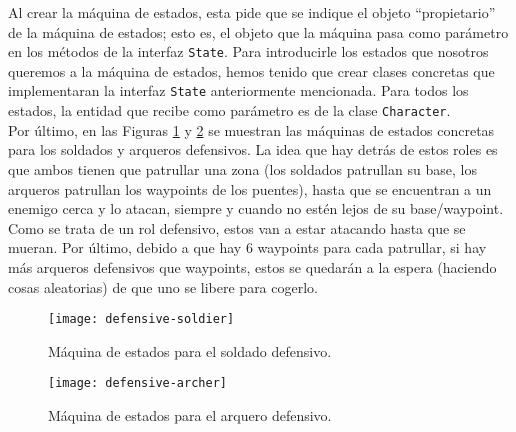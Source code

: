 Al crear la máquina de estados, esta pide que se indique el objeto ``propietario'' de la máquina de estados; esto es, el objeto que la máquina pasa como parámetro en los métodos de la interfaz \texttt{State}. Para introducirle los estados que nosotros queremos a la máquina de estados, hemos tenido que crear clases concretas que implementaran la interfaz \texttt{State} anteriormente mencionada. Para todos los estados, la entidad que recibe como parámetro es de la clase \texttt{Character}. \\

Por último, en las Figuras \ref{defensivos:soldado} y \ref{defensivos:arquero} se muestran las máquinas de estados concretas para los soldados y arqueros defensivos. La idea que hay detrás de estos roles es que ambos tienen que patrullar una zona (los soldados patrullan su base, los arqueros patrullan los waypoints de los puentes), hasta que se encuentran a un enemigo cerca y lo atacan, siempre y cuando no estén lejos de su base/waypoint. Como se trata de un rol defensivo, estos van a estar atacando hasta que se mueran. Por último, debido a que hay 6 waypoints para cada patrullar, si hay más arqueros defensivos que waypoints, estos se quedarán a la espera (haciendo cosas aleatorias) de que uno se libere para cogerlo.
\begin{figure}[!th]
\texttt{[image: defensive-soldier]}
\centering
\caption{Máquina de estados para el soldado defensivo.}
\label{defensivos:soldado}
\end{figure}
\begin{figure}[!th]
\texttt{[image: defensive-archer]}
\centering
\caption{Máquina de estados para el arquero defensivo.}
\label{defensivos:arquero}
\end{figure}

